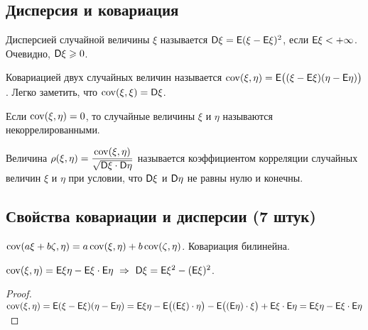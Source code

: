 \subsection{Дисперсия и ковариация}
\begin{definition}
	Дисперсией случайной величины $\xi$ называется $\mathsf{D} \xi = \mathsf{E} (\xi - \mathsf{E} \xi)^2 $, если $\mathsf{E}{\xi} < + \infty$. Очевидно, $\mathsf{D}{\xi} \geqslant 0$.
\end{definition}

\begin{definition}
	Ковариацией двух случайных величин называется $\operatorname{cov} (\xi, \eta) = \mathsf{E} \big( ( \xi - \mathsf{E} \xi)(\eta - \mathsf{E} \eta ) \big)$. Легко заметить, что $\operatorname{cov} (\xi, \xi ) = \mathsf{D} \xi$.
\end{definition}

\begin{definition}
    Если $\operatorname{cov}(\xi, \eta) = 0$, то случайные величины $\xi$ и $\eta$ называются некоррелированными.
\end{definition}

\begin{definition}
	Величина $\rho ( \xi, \eta ) = \dfrac{\operatorname{cov} ( \xi, \eta )}{\sqrt{\mathsf{D} \xi \cdot \mathsf{D} \eta}}$ называется коэффициентом корреляции случайных величин $\xi$ и $\eta$ при условии, что $\mathsf{D} \xi$ и $\mathsf{D} \eta$ не равны нулю и конечны.
\end{definition}

\subsection{Свойства ковариации и дисперсии (7 штук)}
\setcounter{property}{0}
\begin{property}
	$\operatorname{cov}( a \xi + b \zeta, \eta ) = a \operatorname{cov} (\xi, \eta) + b \operatorname{cov} (\zeta, \eta)$. Ковариация билинейна.
\end{property}

\begin{property}
	$\operatorname{cov}( \xi,  \eta ) = \mathsf{E} \xi \eta - \mathsf{E} \xi \cdot \mathsf{E} \eta ~\Rightarrow ~ \mathsf{D} \xi = \mathsf{E} \xi^2 - ( \mathsf{E} \xi )^2$.
	\begin{proof}
		$\operatorname{cov} (\xi, \eta ) = \mathsf{E} (\xi - \mathsf{E} \xi)( \eta - \mathsf{E} \eta) = \mathsf{E} \xi \eta - \mathsf{E} \big( ( \mathsf{E} \xi ) \cdot \eta \big) - \mathsf{E} \big( (\mathsf{E} \eta ) \cdot \xi \big) + \mathsf{E} \xi \cdot \mathsf{E} \eta = \mathsf{E} \xi \eta - \mathsf{E} \xi \cdot \mathsf{E} \eta $
	\end{proof}
\end{property}

